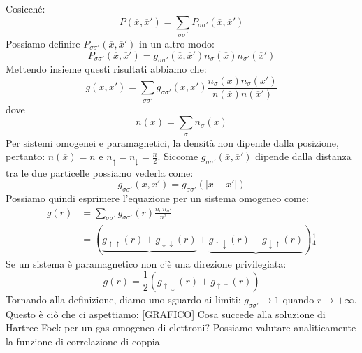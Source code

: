 Cosicché:
\begin{equation*}
    P(\overline x, \overline{x}')=\sum_{\sigma \sigma'}P_{\sigma\sigma'}(\overline x, \overline{x}')
\end{equation*}
Possiamo definire $P_{\sigma\sigma'}(\overline x, \overline{x}')$ in un altro modo:
\begin{equation*}
    P_{\sigma\sigma'}(\overline x, \overline{x}')=g_{\sigma\sigma'}(\overline{x}, \overline{x}')n_\sigma(\overline x)n_{\sigma'}(\overline{x}')
\end{equation*}
Mettendo insieme questi risultati abbiamo che:
\begin{equation*}
    g(\overline x, \overline{x}')=\sum_{\sigma \sigma'}g_{\sigma\sigma'}(\overline x, \overline{x}')\frac{n_\sigma(\overline x)n_\sigma(\overline{x}')}{n(\overline x)n(\overline{x}')}
\end{equation*}
dove
\begin{equation*}
    n(\overline x)=\sum_\sigma n_\sigma(\overline x)
\end{equation*}
Per sistemi omogenei e paramagnetici, la densità non dipende dalla posizione, pertanto: $n(\overline x)=n$ e $n_\uparrow=n_\downarrow=\frac n2$.
Siccome $g_{\sigma\sigma'}(\overline x, \overline{x}')$ dipende dalla distanza tra le due particelle possiamo vederla come:
\begin{equation*}
    g_{\sigma\sigma'}(\overline x, \overline{x}')=g_{\sigma\sigma'}(|\overline x- \overline x'|)
\end{equation*}
Possiamo quindi esprimere l'equazione per un sistema omogeneo come:
\begin{equation*}
    \begin{aligned}
    g(r) & =\sum_{\sigma\sigma'}g_{\sigma\sigma'}(r)\frac{n_\sigma n_{\sigma'}}{n^2} \\
        & = (\underbrace{g_{\uparrow\uparrow}(r)+g_{\downarrow\downarrow}(r)}+\underbrace{g_{\uparrow\downarrow}(r)+g_{\downarrow\uparrow}(r)})\frac 14
    \end{aligned}
\end{equation*}
Se un sistema è paramagnetico non c'è una direzione privilegiata:
\begin{equation*}
    g(r)=\frac 12(g_{\uparrow\downarrow}(r)+g_{\uparrow\uparrow}(r))
\end{equation*}
Tornando alla definizione, diamo uno sguardo ai limiti: $g_{\sigma\sigma'}\rightarrow 1$ quando $r\rightarrow +\infty$. Questo è ciò che ci aspettiamo:
[GRAFICO]
Cosa succede alla soluzione di Hartree-Fock per un gas omogeneo di elettroni? Possiamo valutare analiticamente la funzione di correlazione di coppia
